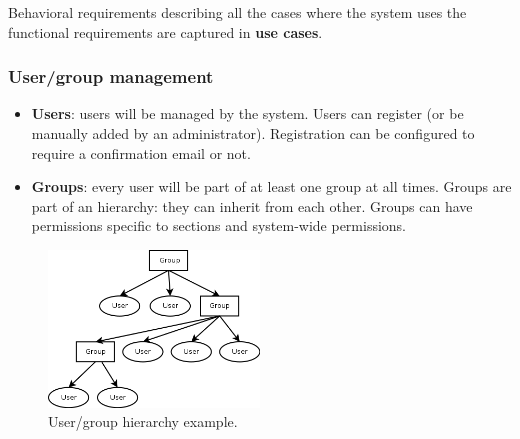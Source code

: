 \documentclass[12pt]{report}
\renewcommand\emph{\textbf}
\begin{document}
                    Behavioral requirements describing all the cases where the system uses the functional requirements are captured in \emph{use cases}.

                    \subsubsection{User/group management}
                        \begin{itemize}
                            \item \emph{Users}: users will be managed by the system. Users can register (or be manually added by an administrator). Registration can be configured to require a confirmation email or not.
                            \item \emph{Groups}: every user will be part of at least one group at all times. Groups are part of an hierarchy: they can inherit from each other. Groups can have permissions specific to sections and system-wide permissions.
                        \end{itemize}

                        \begin{figure}[h]
                        \caption{User/group hierarchy example.}
                        \centering
                        \includegraphics[width=0.5\textwidth]{ed/hier_user}
                        \end{figure}
\end{document}
